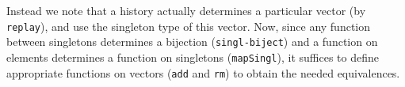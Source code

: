 Instead we note that a history actually determines a particular vector (by \texttt{replay}), and use the singleton
type of this vector. Now, since any function between singletons determines a bijection (\texttt{singl-biject})
and a function on elements determines a function on singletons (\texttt{mapSingl}), it suffices to
define appropriate functions on vectors (\texttt{add} and \texttt{rm}) to obtain the needed equivalences.
\begin{code}%
\>[0]\AgdaSpace{}%
\AgdaSymbol{:}\AgdaSpace{}%
\AgdaSymbol{\{}\AgdaSpace{}%
\AgdaSymbol{:}\AgdaSpace{}%
\AgdaSymbol{\}}\AgdaSpace{}%
\AgdaSpace{}%
\AgdaSpace{}%
\AgdaSpace{}%
\AgdaSpace{}%
\AgdaSpace{}%
\AgdaSpace{}%
\AgdaSpace{}%
\<%
\\
\>[0]\AgdaSpace{}%
\AgdaInductiveConstructor{[]}\AgdaSpace{}%
\AgdaSymbol{=}\AgdaSpace{}%
\AgdaInductiveConstructor{[]}\<%
\\
\>[0]\AgdaSpace{}%
\AgdaSymbol{(}\AgdaSpace{}%
\AgdaSpace{}%
\AgdaSpace{}%
\AgdaSpace{}%
\AgdaOperator{\AgdaInductiveConstructor{::}}\AgdaSpace{}%
\AgdaSymbol{)}\AgdaSpace{}%
\AgdaSymbol{=}\AgdaSpace{}%
\AgdaSpace{}%
\AgdaSpace{}%
\AgdaSpace{}%
\AgdaSymbol{(}\AgdaSpace{}%
\AgdaSymbol{)}\<%
\\
\>[0]\AgdaSpace{}%
\AgdaSymbol{(}\AgdaSpace{}%
\AgdaSpace{}%
\AgdaOperator{\AgdaInductiveConstructor{::}}\AgdaSpace{}%
\AgdaSymbol{)}\AgdaSpace{}%
\AgdaSymbol{=}\AgdaSpace{}%
\AgdaSpace{}%
\AgdaSpace{}%
\AgdaSymbol{(}\AgdaSpace{}%
\AgdaSymbol{)}\<%
\\
%
\\[\AgdaEmptyExtraSkip]%
\>[0]\AgdaSpace{}%
\AgdaSymbol{:}\AgdaSpace{}%
\AgdaSpace{}%
\AgdaSpace{}%
\<%
\\
\>[0]\AgdaSpace{}%
\AgdaSymbol{(}\AgdaSpace{}%
\AgdaSymbol{)}\AgdaSpace{}%
\AgdaSymbol{=}\AgdaSpace{}%
\AgdaSpace{}%

\end{code}
